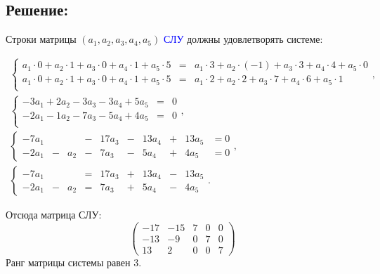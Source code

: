 \documentclass[12pt]{article}
\begin{document}
    \subsection*{Решение:}
    Строки матрицы $\left ( a_1, a_2, a_3, a_4, a_5 \right )$ \textcolor{blue}{СЛУ} должны удовлетворять системе:
        {\color{blue}
    \begin{gather*}
        \left \{
        \begin{array}{lll}
            a_1 \cdot 0 + a_2 \cdot 1 + a_3 \cdot 0 + a_4 \cdot 1 + a_5 \cdot 5 & = & a_1 \cdot 3 + a_2 \cdot (-1) + a_3 \cdot 3 + a_4 \cdot 4 + a_5 \cdot 0 \\
            a_1 \cdot 0 + a_2 \cdot 1 + a_3 \cdot 0 + a_4 \cdot 1 + a_5 \cdot 5 & = & a_1 \cdot 2 + a_2 \cdot 2 + a_3 \cdot 7 + a_4 \cdot 6 + a_5 \cdot 1    \\
        \end{array}
        \right . , \\
        \left \{
        \begin{array}{lll}
            -3 a_1 + 2 a_2 - 3 a_3 - 3 a_4 + 5 a_5 & = & 0 \\
            -2 a_1 - 1 a_2 - 7 a_3 - 5 a_4 + 4 a_5 & = & 0 \\
        \end{array}
        \right . , \\
        \left \{
        \begin{array}{cccccccccc}
            -7 a_1 &   &     & - & 17 a_3 & - & 13 a_4 & + & 13 a_5 & = 0 \\
            -2 a_1 & - & a_2 & - & 7 a_3  & - & 5 a_4  & + & 4 a_5  & = 0
        \end{array}
        \right . , \\
        \left \{
        \begin{array}{cccccccccc}
            -7 a_1 &   &     & = & 17 a_3 & + & 13 a_4 & - & 13 a_5 \\
            -2 a_1 & - & a_2 & = & 7 a_3  & + & 5 a_4  & - & 4 a_5
        \end{array}
        \right .
        .
    \end{gather*}

    Отсюда матрица СЛУ:
    \[
        \begin{pmatrix}
            - 17 & - 15 & 7 & 0 & 0 \\
            -13  & - 9  & 0 & 7 & 0 \\
            13   & 2   & 0 & 0 & 7
        \end{pmatrix}
    \]
    Ранг матрицы системы равен 3.

}
\end{document}
